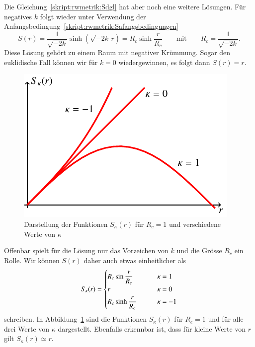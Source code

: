 Die Gleichung~\eqref{skript:rwmetrik:Sdgl} hat aber noch eine weitere 
Lösungen.
Für negatives $k$ folgt wieder unter Verwendung der
Anfangsbedingung~\eqref{skript:rwmetrik:Safangsbedingungen}
\begin{equation}
S(r)=\frac{1}{\sqrt{-2k}}\sinh(\sqrt{-2k}\, r)
=
R_c\sinh\frac{r}{R_c}
\qquad\text{mit}\qquad
R_c=\frac1{\sqrt{-2k}}.
\label{skript:rwmetrik:sinhloesung}
\end{equation}
Diese Lösung gehört zu einem Raum mit negativer Krümmung.
Sogar den euklidische Fall können wir für $k=0$ wiedergewinnen, es folgt
dann $S(r)=r$.

\begin{figure}
\centering
\includegraphics{chapters/tikz/robertson.pdf}
\caption{Darstellung der Funktionen $S_\kappa(r)$ für $R_c=1$ und
verschiedene Werte von $\kappa$
\label{skript:Skappa:graph}}
\end{figure}

Offenbar spielt für die Lösung  nur das Vorzeichen von $k$ und die
Grösse $R_c$ ein Rolle.
Wir können $S(r)$ daher auch etwas einheitlicher als
\begin{equation}
S_\kappa(r) = \begin{cases}
R_c\sin  \displaystyle\frac{\mathstrut r}{R_c} &\qquad \kappa= 1\\
r                                              &\qquad \kappa= 0\\
R_c\sinh \displaystyle\frac{\mathstrut r}{R_c} &\qquad \kappa=-1
\end{cases}
\label{skript:rwmetrik:Skappa}
\end{equation}
schreiben.
In Abbildung~\ref{skript:Skappa:graph} sind die Funktionen $S_\kappa(r)$
für $R_c=1$ und für alle drei Werte von $\kappa$ dargestellt.
Ebenfalls erkennbar ist, dass für kleine Werte von $r$ gilt
$S_\kappa(r)\simeq r$.

